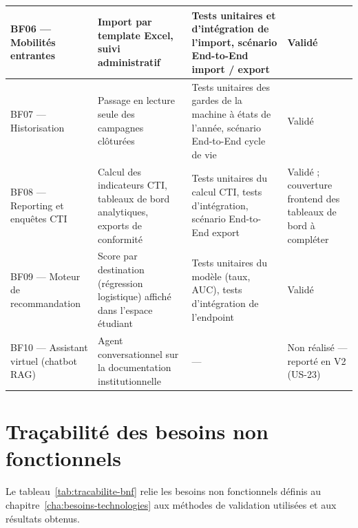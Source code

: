 \begin{longtable}{|p{2.8cm}|p{4.6cm}|p{4.4cm}|p{2.6cm}|}
\hline

BF06 --- Mobilités entrantes &
Import par template Excel, suivi administratif &
Tests unitaires et d'intégration de l'import, scénario End-to-End import / export &
Validé \\

\hline

BF07 --- Historisation &
Passage en lecture seule des campagnes clôturées &
Tests unitaires des gardes de la machine à états de l'année, scénario End-to-End cycle de vie &
Validé \\

\hline

BF08 --- Reporting et enquêtes CTI &
Calcul des indicateurs CTI, tableaux de bord analytiques, exports de conformité &
Tests unitaires du calcul CTI, tests d'intégration, scénario End-to-End export &
Validé ; couverture frontend des tableaux de bord à compléter \\

\hline

BF09 --- Moteur de recommandation &
Score par destination (régression logistique) affiché dans l'espace étudiant &
Tests unitaires du modèle (taux, AUC), tests d'intégration de l'endpoint  &
Validé \\

\hline

BF10 --- Assistant virtuel (chatbot RAG) &
Agent conversationnel sur la documentation institutionnelle &
--- &
Non réalisé --- reporté en V2 (US-23) \\

\hline

\end{longtable}


\section{Traçabilité des besoins non fonctionnels}

\label{sec:tracabilite-bnf}


Le tableau~\ref{tab:tracabilite-bnf} relie les besoins non fonctionnels définis au chapitre~\ref{cha:besoins-technologies} aux méthodes de validation utilisées et aux résultats obtenus.

\renewcommand{\arraystretch}{1.3}

